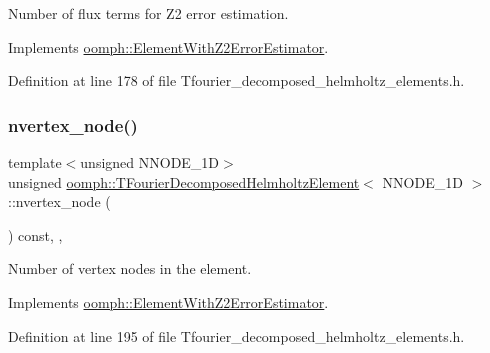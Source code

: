 Number of \textquotesingle{}flux\textquotesingle{} terms for Z2 error estimation. 



Implements \hyperlink{classoomph_1_1ElementWithZ2ErrorEstimator_ae82c5728902e13da31be19c390fc28e3}{oomph\+::\+Element\+With\+Z2\+Error\+Estimator}.



Definition at line 178 of file Tfourier\+\_\+decomposed\+\_\+helmholtz\+\_\+elements.\+h.

\mbox{\label{classoomph_1_1TFourierDecomposedHelmholtzElement_a283748c9f17bf71639fe86d407d9d041}} 
\subsubsection{\texorpdfstring{nvertex\+\_\+node()}{nvertex\_node()}}
{\footnotesize\ttfamily template$<$unsigned N\+N\+O\+D\+E\+\_\+1D$>$ \\
unsigned \hyperlink{classoomph_1_1TFourierDecomposedHelmholtzElement}{oomph\+::\+T\+Fourier\+Decomposed\+Helmholtz\+Element}$<$ N\+N\+O\+D\+E\+\_\+1D $>$\+::nvertex\+\_\+node (\begin{DoxyParamCaption}{ }\end{DoxyParamCaption}) const\hspace{0.3cm}{\ttfamily [inline]}, {\ttfamily [protected]}, {\ttfamily [virtual]}}



Number of vertex nodes in the element. 



Implements \hyperlink{classoomph_1_1ElementWithZ2ErrorEstimator_a19495a0e77ef4ff35f15fdf7913b4077}{oomph\+::\+Element\+With\+Z2\+Error\+Estimator}.



Definition at line 195 of file Tfourier\+\_\+decomposed\+\_\+helmholtz\+\_\+elements.\+h.

\mbox{\label{classoomph_1_1TFourierDecomposedHelmholtzElement_acbbeefc2997cac4a50605f3fe107596b}} 
